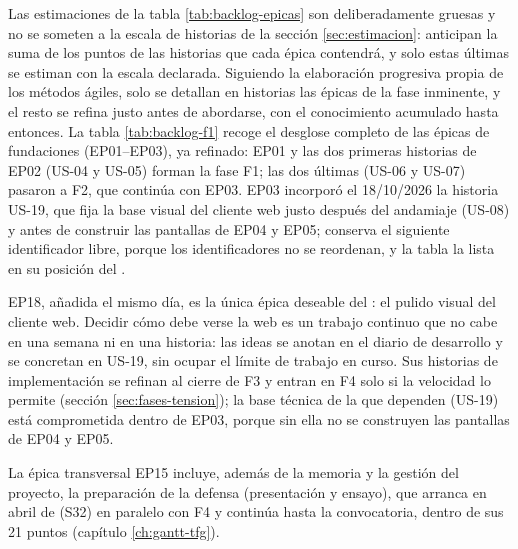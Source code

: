 Las estimaciones de la tabla \ref{tab:backlog-epicas} son deliberadamente gruesas y no se someten a la escala de historias de la sección \ref{sec:estimacion}: anticipan la suma de los puntos de las historias que cada épica contendrá, y solo estas últimas se estiman con la escala declarada.
Siguiendo la elaboración progresiva propia de los métodos ágiles, solo se detallan en historias las épicas de la fase inminente, y el resto se refina justo antes de abordarse, con el conocimiento acumulado hasta entonces.
La tabla \ref{tab:backlog-f1} recoge el desglose completo de las épicas de fundaciones (EP01--EP03), ya refinado: EP01 y las dos primeras historias de EP02 (US-04 y US-05) forman la fase F1; las dos últimas (US-06 y US-07) pasaron a F2, que continúa con EP03.
EP03 incorporó el 18/10/2026 la historia US-19, que fija la base visual del cliente web justo después del andamiaje (US-08) y antes de construir las pantallas de EP04 y EP05; conserva el siguiente identificador libre, porque los identificadores no se reordenan, y la tabla la lista en su posición del .

EP18, añadida el mismo día, es la única épica deseable del : el pulido visual del cliente web.
Decidir cómo debe verse la web es un trabajo continuo que no cabe en una semana ni en una historia: las ideas se anotan en el diario de desarrollo y se concretan en US-19, sin ocupar el límite de trabajo en curso.
Sus historias de implementación se refinan al cierre de F3 y entran en F4 solo si la velocidad lo permite (sección \ref{sec:fases-tension}); la base técnica de la que dependen (US-19) está comprometida dentro de EP03, porque sin ella no se construyen las pantallas de EP04 y EP05.

La épica transversal EP15 incluye, además de la memoria y la gestión del proyecto, la preparación de la defensa (presentación y ensayo), que arranca en abril de \thesisYear{} (S32) en paralelo con F4 y continúa hasta la convocatoria, dentro de sus 21 puntos (capítulo \ref{ch:gantt-tfg}).

